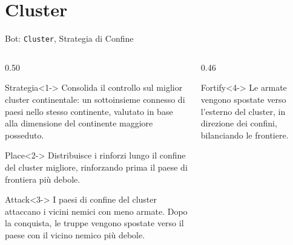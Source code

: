 \documentclass[9pt,serif,usenames,dvipsnames]{beamer}
\begin{document}
	\section{Cluster}
	\begin{frame}{\centering Bot: \texttt{Cluster}, Strategia di Confine}
		\begin{columns}[T]
			\begin{column}{0.50\textwidth}
				\begin{block}{Strategia}<1->
					\small
					Consolida il controllo sul \alert{miglior cluster continentale}:
					un sottoinsieme connesso di paesi nello stesso continente,
					valutato in base alla dimensione del continente maggiore
					posseduto.
				\end{block}
				\vspace{0.42cm}
				\begin{block}{Place}<2->
					\small
					Distribuisce i rinforzi \alert{lungo il confine del cluster
						migliore}, rinforzando prima il paese di frontiera più debole.
				\end{block}
				\vspace{0.42cm}
				\begin{block}{Attack}<3->
					\small
					I paesi di confine del cluster attaccano i vicini nemici con
					\alert{meno armate}. Dopo la conquista, le truppe vengono
					spostate verso il paese con il vicino nemico più debole.
				\end{block}
			\end{column}
			\begin{column}{0.46\textwidth}
				\begin{block}{Fortify}<4->
					\small
					Le armate vengono spostate \alert{verso l'esterno del cluster},
					in direzione dei confini, bilanciando le frontiere.
				\end{block}
				\begin{center}
\end{center}
\end{column}
\end{columns}
\end{frame}
\end{document}
